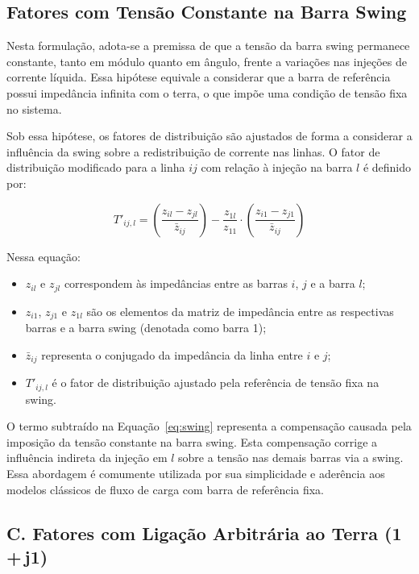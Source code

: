 \documentclass[journal]{IEEEtran}
\begin{document}
\subsection{Fatores com Tensão Constante na Barra Swing}

Nesta formulação, adota-se a premissa de que a tensão da barra swing permanece constante, tanto em módulo quanto em ângulo, frente a variações nas injeções de corrente líquida. Essa hipótese equivale a considerar que a barra de referência possui impedância infinita com o terra, o que impõe uma condição de tensão fixa no sistema.

Sob essa hipótese, os fatores de distribuição são ajustados de forma a considerar a influência da swing sobre a redistribuição de corrente nas linhas. O fator de distribuição modificado para a linha \( ij \) com relação à injeção na barra \( l \) é definido por:

\begin{equation}
T'_{ij,l} = \left( \frac{z_{il} - z_{jl}}{\bar{z}_{ij}} \right) - \frac{z_{1l}}{z_{11}} \cdot \left( \frac{z_{i1} - z_{j1}}{\bar{z}_{ij}} \right)
\label{eq:swing}
\end{equation}

Nessa equação:
\begin{itemize}
  \item \( z_{il} \) e \( z_{jl} \) correspondem às impedâncias entre as barras \( i \), \( j \) e a barra \( l \);
  \item \( z_{i1} \), \( z_{j1} \) e \( z_{1l} \) são os elementos da matriz de impedância entre as respectivas barras e a barra swing (denotada como barra 1);
  \item \( \bar{z}_{ij} \) representa o conjugado da impedância da linha entre \( i \) e \( j \);
  \item \( T'_{ij,l} \) é o fator de distribuição ajustado pela referência de tensão fixa na swing.
\end{itemize}

O termo subtraído na Equação~\eqref{eq:swing} representa a compensação causada pela imposição da tensão constante na barra swing. Esta compensação corrige a influência indireta da injeção em \( l \) sobre a tensão nas demais barras via a swing. Essa abordagem é comumente utilizada por sua simplicidade e aderência aos modelos clássicos de fluxo de carga com barra de referência fixa.

\subsection*{C. Fatores com Ligação Arbitrária ao Terra (1\,+\,j1)}
\end{document}
